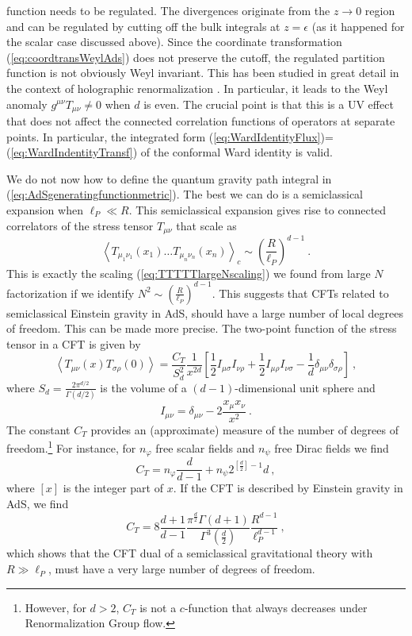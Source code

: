 \documentclass{ws-rv9x6}
\newcommand\be{\begin{equation}}
\newcommand\ee{\end{equation}}
\begin{document}
function needs to be regulated. The divergences originate from the
$z\to0$ region and can be regulated by cutting off the bulk integrals
at $z=\epsilon$ (as it happened for the scalar case discussed above).
Since the coordinate transformation (\ref{eq:coordtransWeylAds})
does not preserve the cutoff, the regulated partition function is
not obviously Weyl invariant. This has been studied in great detail
in the context of holographic renormalization \cite{hep-th/9902121, hep-th/0209067}.
In particular, it leads to the Weyl anomaly $g^{\mu\nu}T_{\mu\nu}\neq0$
when $d$ is even. The crucial point is that this is a UV effect that
does not affect the connected correlation functions of operators at
separate points.  
In particular, the integrated form (\ref{eq:WardIdentityFlux})=(\ref{eq:WardIndentityTransf})
of the conformal Ward identity is valid.

We do not now how to define the quantum gravity path integral in (\ref{eq:AdSgeneratingfunctionmetric}).
The best we can do is a semiclassical expansion when $\ell_{P}\ll R$.
This semiclassical expansion gives rise to connected correlators of
the stress tensor $T_{\mu\nu}$ that scale as 
\be
\left\langle T_{\mu_{1}\nu_{1}}(x_{1})\dots T_{\mu_{n}\nu_{n}}(x_{n})\right\rangle _{c}\sim\left(\frac{R}{\ell_{P}}\right)^{d-1}\ .
\ee
 This is exactly the scaling (\ref{eq:TTTTTlargeNscaling}) we found
from large $N$ factorization if we identify $N^{2}\sim\left(\frac{R}{\ell_{P}}\right)^{d-1}$.
This suggests that CFTs related to semiclassical Einstein gravity
in AdS, should have a large number of local degrees of freedom. This
can be made more precise. The two-point function of the stress tensor
in a CFT is given by
\be
\left\langle T_{\mu\nu}(x)T_{\sigma\rho}(0)\right\rangle =\frac{C_{T}}{S_{d}^{2}}\frac{1}{x{}^{2d}}\left[\frac{1}{2}I_{\mu\sigma}I_{\nu\rho}+\frac{1}{2}I_{\mu\rho}I_{\nu\sigma}-\frac{1}{d}\delta_{\mu\nu}\delta_{\sigma\rho}\right]\ ,
\ee
where $S_{d}=\frac{2\pi^{d/2}}{\Gamma(d/2)}$ is the volume of a $(d-1)$-dimensional
unit sphere and 
\be
I_{\mu\nu}=\delta_{\mu\nu}-2\frac{x_{\mu}x_{\nu}}{x^{2}}\ .
\ee
The constant $C_{T}$ provides an (approximate) measure of the number of degrees
of freedom.\footnote{However, for $d>2$, $C_T$ is not a $c$-function that always decreases under  Renormalization Group flow.}
For instance, for $n_{\varphi}$ free scalar fields and
$n_{\psi}$ free Dirac fields we find \cite{hep-th/9307010}%
\be
C_{T}=n_{\varphi}\frac{d}{d-1}+n_{\psi}2^{\left[\frac{d}{2}\right]-1}d\ ,
\ee
where $\left[x\right]$ is the integer part of $x$.
If the CFT is described by Einstein gravity in AdS, we find \cite{hep-th/9804083}
\be
C_{T}=8\frac{d+1}{d-1}\frac{\pi^{\frac{d}{2}}\Gamma(d+1)}{\Gamma^{3}\left(\frac{d}{2}\right)}\frac{R^{d-1}}{\ell_{P}^{d-1}}\ ,
\ee
which shows that the CFT dual of a semiclassical gravitational theory
with $R\gg\ell_{P}$, must have a very large number of degrees of
freedom.
\end{document}
